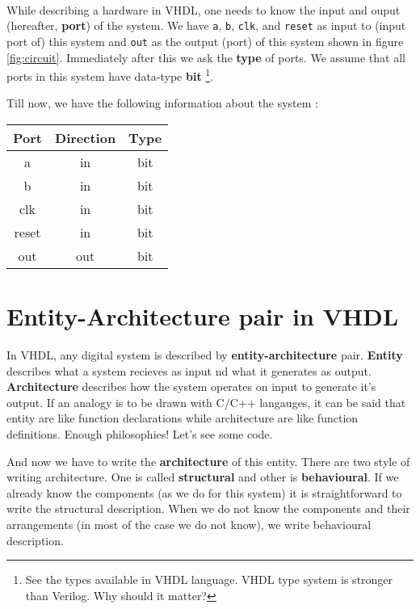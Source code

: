\documentclass[a4paper,10pt]{article}
\begin{document}
\paragraph{}

  While describing a hardware in VHDL, one needs to know the input and ouput
  (hereafter, \textbf{port}) of the system. We have \texttt{a}, \texttt{b},
  \texttt{clk}, and \texttt{reset} as input to (input port of) this system and
  \texttt{out} as the output (port) of this system shown in figure
  \ref{fig:circuit}. Immediately after this we ask
  the \textbf{type} of ports. We assume that all ports in this system have data-type
  \textbf{bit} \footnote{See the types available in VHDL language. VHDL type
  system is stronger than Verilog. Why should it matter?}.

  Till now, we have the following information about the system :

  \begin{table}[h]
    \centering
  \begin{tabular}{c|c|c}
    Port & Direction & Type \\
    \hline 
    a & in & bit \\
    b & in & bit \\ 
    clk & in & bit \\ 
    reset & in & bit \\ 
    out & out & bit \\
    \hline
  \end{tabular}
\end{table}


\section{Entity-Architecture pair in VHDL}
  
In VHDL, any digital system is described by \textbf{entity-architecture} pair.
\textbf{Entity} describes what a system recieves as input nd what it generates
as output. \textbf{Architecture} describes how the system operates on input to
generate it's output. If an analogy is to be drawn with C/C++ langauges, it can
be said that entity are like function declarations while architecture are like
function definitions. Enough philosophies! Let's see some code.



And now we have to write the \textbf{architecture} of this entity. There are two
style of writing architecture. One is called \textbf{structural} and other is
\textbf{behavioural}. If we already know the components (as we do for this
system) it is straightforward to write the structural description. When we do
not know the components and their arrangements (in most of the case we do not
know), we write behavioural description. 
\end{document}
